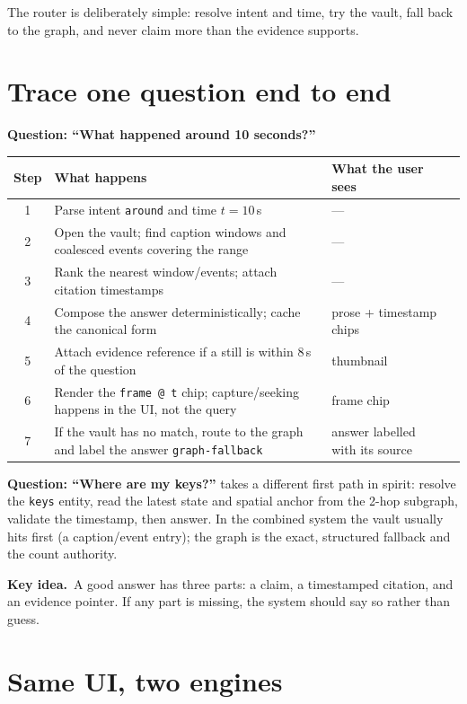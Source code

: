 \documentclass[10pt,a4paper]{article}
\newcommand{\code}[1]{\texttt{\small #1}}
\newcommand{\keyidea}[1]{%
  \par\medskip\noindent\colorbox{panel}{%
    \begin{minipage}{\dimexpr\linewidth-2\fboxsep\relax}
    \vspace{2pt}\textbf{\textcolor{accent}{Key idea.}}\ #1\vspace{2pt}
    \end{minipage}}\par\medskip
}
\begin{document}
\noindent
The router is deliberately simple: resolve intent and time, try the vault, fall back to the graph,
and never claim more than the evidence supports.

\section{Trace one question end to end}

\noindent
\textbf{Question: ``What happened around 10 seconds?''}

{\small
\begin{longtable}{@{}c p{2.2cm} p{6.1cm} p{6.1cm}@{}}
\toprule
\textbf{Step} & \textbf{What happens} & \textbf{What the user sees} \\
\midrule
\endhead
1 & Parse intent \code{around} and time \(t=10\)\,s & --- \\
2 & Open the vault; find caption windows and coalesced events covering the range & --- \\
3 & Rank the nearest window/events; attach citation timestamps & --- \\
4 & Compose the answer deterministically; cache the canonical form & prose + timestamp chips \\
5 & Attach evidence reference if a still is within 8\,s of the question & thumbnail \\
6 & Render the \code{frame @ t} chip; capture/seeking happens in the UI, not the query & frame chip \\
7 & If the vault has no match, route to the graph and label the answer \code{graph-fallback} & answer labelled with its source \\
\bottomrule
\end{longtable}
}

\vspace{2pt}

\noindent
\textbf{Question: ``Where are my keys?''} takes a different first path in spirit: resolve the
\code{keys} entity, read the latest state and spatial anchor from the 2-hop subgraph, validate the
timestamp, then answer. In the combined system the vault usually hits first (a caption/event entry);
the graph is the exact, structured fallback and the count authority.

\keyidea{A good answer has three parts: a claim, a timestamped citation, and an evidence pointer.
If any part is missing, the system should say so rather than guess.}

\section{Same UI, two engines}
\end{document}
